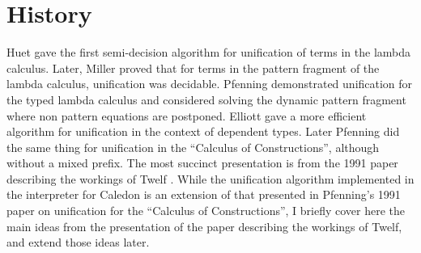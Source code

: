 \section{History}

Huet \citep{Huet75} gave the first semi-decision algorithm for unification of 
terms in the lambda calculus.  
Later, Miller \citep{miller1986higher} proved
that for terms in the pattern fragment of the lambda calculus, unification was decidable.  
Pfenning \citep{pfenning1988partial} \citep{pfenning1988higher} demonstrated unification for the typed lambda calculus and considered solving the dynamic pattern fragment where non pattern equations
are postponed.
Elliott\citep{elliott1989higher} gave a more efficient algorithm for unification in the context 
of dependent types. Later Pfenning \citep{pfenning1991unification}
did the same thing for unification in the ``Calculus of Constructions'', although without a mixed prefix.  
The most succinct presentation is from the 1991 paper describing the workings of Twelf 
\citep{pfenning1991logic}.  While the unification algorithm implemented in the interpreter for Caledon is 
an extension of that presented in Pfenning's 1991 paper on unification for 
the ``Calculus of Constructions''\citep{pfenning1991unification}, 
I briefly cover here the main ideas from the presentation of the paper describing the workings of Twelf, 
and extend those ideas later.


